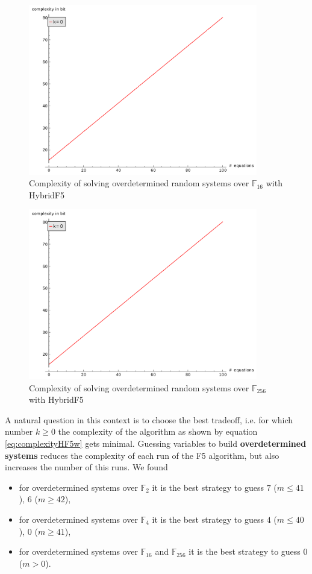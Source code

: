 \begin{figure}
\centering
\includegraphics[width=10cm]{figures/hybridF5_vs_m_gf16.pdf}
\caption{Complexity of solving overdetermined random systems over $\mathbb{F}_{16}$ with HybridF5}
\label{fig:overgf16}
\end{figure}


\begin{figure}
\centering
\includegraphics[width=10cm]{figures/hybridF5_vs_m_gf256.pdf}
\caption{Complexity of solving overdetermined random systems over $\mathbb{F}_{256}$ with HybridF5}
\label{fig:overgf256}
\end{figure}
A natural question in this context is to choose the best tradeoff, i.e. for which number $k\geq 0$ the complexity of the algorithm as shown by equation \eqref{eq:complexityHF5w} gets minimal. Guessing variables to build \textbf{overdetermined systems} reduces the complexity of each run of the F5 algorithm, but also increases the number of this runs. We found

\begin{itemize}
\item for overdetermined systems over $\mathbb{F}_{2}$ it is the best strategy to guess $7$ ($m\leq 41$), $6$ ($m\geq 42$),
\item for overdetermined systems over $\mathbb{F}_{4}$ it is the best strategy to guess $4$ ($m\leq 40$), $0$ ($m\geq 41$),
\item for overdetermined systems over $\mathbb{F}_{16}$ and $\mathbb{F}_{256}$ it is the best strategy to guess $0$ ($m>0$).
\end{itemize}


